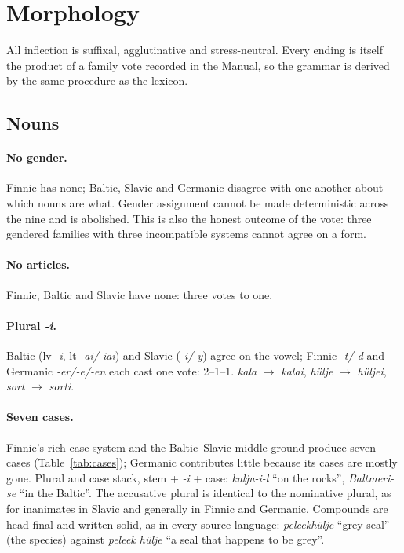 \section{Morphology}\label{sec:morphology}

All inflection is suffixal, agglutinative and stress-neutral. Every ending is itself the product of a family vote recorded in the Manual, so the grammar is derived by the same procedure as the lexicon.

\subsection{Nouns}\label{sec:nouns}
\paragraph{No gender.} Finnic has none; Baltic, Slavic and Germanic disagree with one another about which nouns are what. Gender assignment cannot be made deterministic across the nine and is abolished. This is also the honest outcome of the vote: three gendered families with three incompatible systems cannot agree on a form.

\paragraph{No articles.} Finnic, Baltic and Slavic have none: three votes to one.

\paragraph{Plural \emph{-i}.} Baltic (lv \emph{-i}, lt \emph{-ai/-iai}) and Slavic (\emph{-i/-y}) agree on the vowel; Finnic \emph{-t/-d} and Germanic \emph{-er/-e/-en} each cast one vote: 2--1--1. \emph{kala} $\rightarrow$ \emph{kalai}, \emph{hülje} $\rightarrow$ \emph{hüljei}, \emph{sort} $\rightarrow$ \emph{sorti}.

\paragraph{Seven cases.} Finnic's rich case system and the Baltic--Slavic middle ground produce seven cases (Table~\ref{tab:cases}); Germanic contributes little because its cases are mostly gone. Plural and case stack, stem + \emph{-i} + case: \emph{kalju-i-l} ``on the rocks'', \emph{Baltmeri-se} ``in the Baltic''. The accusative plural is identical to the nominative plural, as for inanimates in Slavic and generally in Finnic and Germanic. Compounds are head-final and written solid, as in every source language: \emph{peleekhülje} ``grey seal'' (the species) against \emph{peleek hülje} ``a seal that happens to be grey''.

